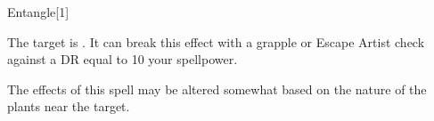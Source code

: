 \begin{spellsection}{Entangle}[1]
    \begin{spellheader}
    \end{spellheader}
    \begin{spellcontent}
        \begin{spelltargetinginfo}
        \end{spelltargetinginfo}
        \begin{spelleffects}
            \spelleffect The target is \entangled.
            It can break this effect with a grapple or Escape Artist check against a DR equal to 10 \add your spellpower.
            \spelldur \durbrief
        \end{spelleffects}
    \end{spellcontent}
    \begin{spellfooter}
        \spellnotes The effects of this spell may be altered somewhat based on the nature of the plants near the target.
        \miscastrandom
    \end{spellfooter}
    \begin{spellaugments}
    \end{spellaugments}
\end{spellsection}

